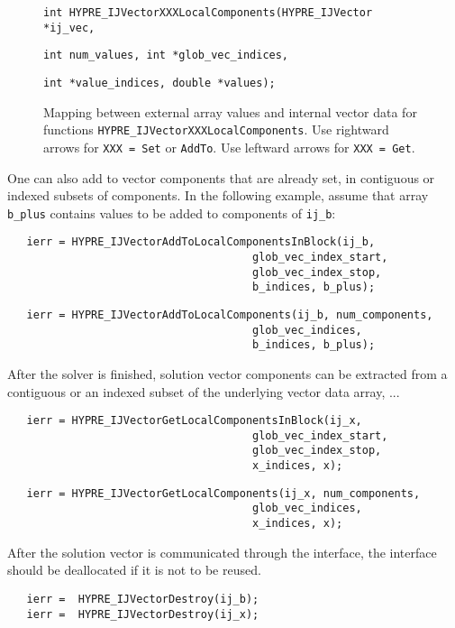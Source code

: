 \begin{figure}
\label{loc_comps}
\centerline{}
\parbox{6.5in}{\hspace{1in}
   {\tt int HYPRE\_IJVectorXXXLocalComponents(HYPRE\_IJVector *ij\_vec,}}
\parbox{6.5in}{\hspace{2in}
   {\tt int num\_values, int *glob\_vec\_indices,}}
\parbox{6.5in}{\hspace{2in}
   {\tt int *value\_indices, double *values);}}
\caption{Mapping between external array values and
   internal vector data for functions
   {\tt HYPRE\_IJVectorXXX}{\tt LocalComponents}.
   Use rightward arrows for {\tt XXX = Set} or {\tt AddTo}.
   Use leftward arrows for {\tt XXX = Get}.}
\end{figure}

One can also add to vector components that are already set, in
contiguous or indexed subsets of components.
In the following example,
assume that array \verb+b_plus+
contains values to be added to components of \verb+ij_b+:

\begin{verbatim}
   ierr = HYPRE_IJVectorAddToLocalComponentsInBlock(ij_b,
                                      glob_vec_index_start,
                                      glob_vec_index_stop,
                                      b_indices, b_plus); 
\end{verbatim}
\begin{verbatim}
   ierr = HYPRE_IJVectorAddToLocalComponents(ij_b, num_components,
                                      glob_vec_indices,
                                      b_indices, b_plus);
\end{verbatim}

\noindent After the solver is finished, solution vector components
can be extracted from a contiguous or an indexed subset of
the underlying vector data array, ...

\begin{verbatim}
   ierr = HYPRE_IJVectorGetLocalComponentsInBlock(ij_x,
                                      glob_vec_index_start,
                                      glob_vec_index_stop,
                                      x_indices, x);
\end{verbatim}
\begin{verbatim}
   ierr = HYPRE_IJVectorGetLocalComponents(ij_x, num_components,
                                      glob_vec_indices,
                                      x_indices, x);
\end{verbatim}

\noindent After the solution vector is communicated through the interface,
the interface should be deallocated if it is not to be reused.

\begin{verbatim}
   ierr =  HYPRE_IJVectorDestroy(ij_b);
   ierr =  HYPRE_IJVectorDestroy(ij_x);
\end{verbatim}



